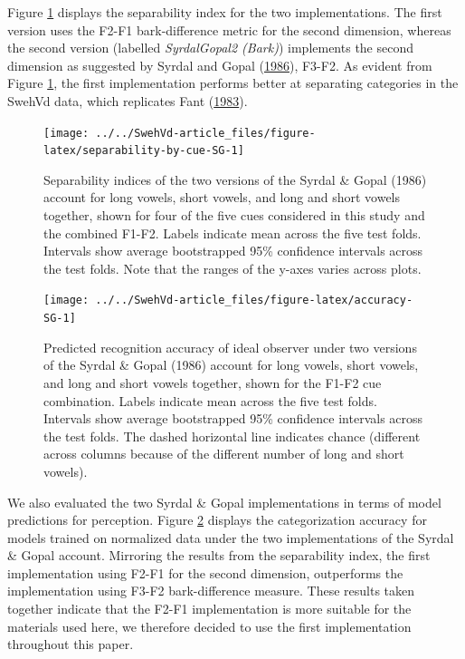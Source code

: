 \documentclass[utf8]{frontiers_suppmat} %
\begin{document}
Figure \ref{fig:separability-by-cue-SG} displays the separability index for the two implementations. The first version uses the F2-F1 bark-difference metric for the second dimension, whereas the second version (labelled \emph{SyrdalGopal2 (Bark)}) implements the second dimension as suggested by Syrdal and Gopal (\protect\hyperlink{ref-Syrdal1986}{1986}), F3-F2. As evident from Figure \ref{fig:separability-by-cue-SG}, the first implementation performs better at separating categories in the SwehVd data, which replicates Fant (\protect\hyperlink{ref-fant1983}{1983}).

\begin{figure}

{\centering \texttt{[image: ../../SwehVd-article\_files/figure-latex/separability-by-cue-SG-1]} 

}

\caption{Separability indices of the two versions of the Syrdal \& Gopal (1986) account for long vowels, short vowels, and long and short vowels together, shown for four of the five cues considered in this study and the combined F1-F2. Labels indicate mean across the five test folds. Intervals show average bootstrapped 95\% confidence intervals across the test folds. Note that the ranges of the y-axes varies across plots.}\label{fig:separability-by-cue-SG}
\end{figure}



\begin{figure}

{\centering \texttt{[image: ../../SwehVd-article\_files/figure-latex/accuracy-SG-1]} 

}

\caption{Predicted recognition accuracy of ideal observer under two versions of the Syrdal \& Gopal (1986) account for long vowels, short vowels, and long and short vowels together, shown for the F1-F2 cue combination. Labels indicate mean across the five test folds. Intervals show average bootstrapped 95\% confidence intervals across the test folds. The dashed horizontal line indicates chance (different across columns because of the different number of long and short vowels).}\label{fig:accuracy-SG}
\end{figure}

We also evaluated the two Syrdal \& Gopal implementations in terms of model predictions for perception. Figure \ref{fig:accuracy-SG} displays the categorization accuracy for models trained on normalized data under the two implementations of the Syrdal \& Gopal account. Mirroring the results from the separability index, the first implementation using F2-F1 for the second dimension, outperforms the implementation using F3-F2 bark-difference measure. These results taken together indicate that the F2-F1 implementation is more suitable for the materials used here, we therefore decided to use the first implementation throughout this paper.
\end{document}
